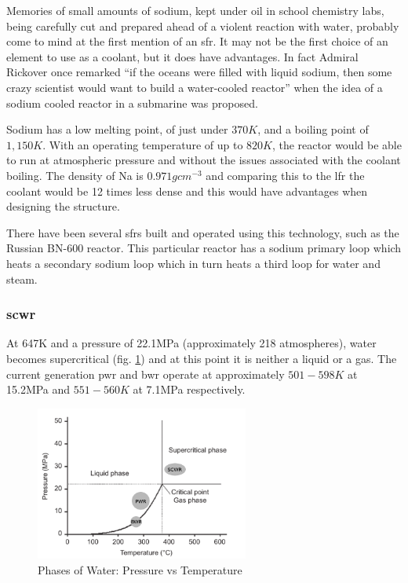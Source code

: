Memories of small amounts of sodium, kept under oil in school chemistry labs, being carefully cut and prepared ahead of a violent reaction with water, probably come to mind at the first mention of an \acrfull{sfr}.  It may not be the first choice of an element to use as a coolant, but it does have advantages.  In fact Admiral Rickover once remarked \enquote{if the oceans were filled with liquid sodium, then some crazy scientist would want to build a water-cooled reactor} when the idea of a sodium cooled reactor in a submarine was proposed\cite{atomicaccidents}.

Sodium has a low melting point, of just under $370K$, and a boiling point of $1,150K$.  With an operating temperature of up to $820K$, the reactor would be able to run at atmospheric pressure and without the issues associated with the coolant boiling.  The density of Na is $0.971 gcm^{-3}$ and comparing this to the \acrshort{lfr} the coolant would be 12 times less dense and this would have advantages when designing the structure.

There have been several \acrshort{sfr}s built and operated using this technology, such as the Russian BN-600 reactor.  This particular reactor has a sodium primary loop which heats a secondary sodium loop which in turn heats a third loop for water and steam.




\subsubsection{\acrshort{scwr}}

At 647K and a pressure of 22.1MPa (approximately 218 atmospheres), water becomes \gls{supercritical} (fig. \ref{fig:waterphasespressuretemp}) and at this point it is neither a liquid or a gas\cite{advancedbiomass}.  The current generation \acrshort{pwr} and \acrshort{bwr} operate at approximately $501-598K$ at 15.2MPa\cite{ocw01} and $551-560K$ at 7.1MPa\cite{ocw02} respectively.

\begin{figure}[tbp]
  \begin{center}
    \includegraphics[width=7.0cm]{chapters/introduction/images/water_phase_diagram.png}
    \caption{Phases of Water:  Pressure vs Temperature}
    \label{fig:waterphasespressuretemp}
  \end{center}
\end{figure}

